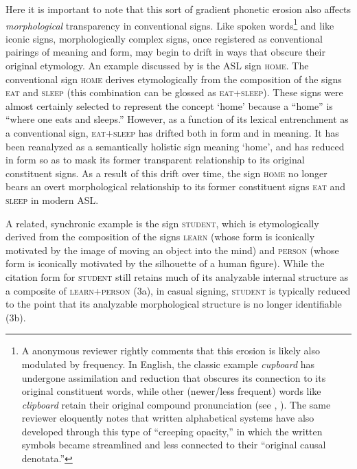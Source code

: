\documentclass[output=paper,
modfonts
]{LSP/langsci}
\begin{document}
  Here it is important to note that this sort of gradient phonetic erosion also affects \textit{morphological} transparency in conventional signs. Like spoken words\footnote{A anonymous reviewer rightly comments that this erosion is likely also modulated by frequency. In English, the classic example \textit{cupboard} has undergone assimilation and reduction that obscures its connection to its original constituent words, while other (newer/less frequent) words like \textit{clipboard} retain their original compound pronunciation (see \citealt{Zipf1935}, \citealt{Bybee2001}). The same reviewer eloquently notes that written alphabetical systems have also developed through this type of ``creeping opacity,'' in which the written symbols became streamlined and less connected to their ``original causal denotata.''} and like iconic signs, morphologically complex signs, once registered as conventional pairings of meaning and form, may begin to drift in ways that obscure their original etymology. An example discussed by \citet[707]{Frishberg1975} is the ASL sign \textsc{home}. The conventional sign \textsc{home} derives etymologically from the composition of the signs \textsc{eat} and \textsc{sleep} (this combination can be glossed as \textsc{eat+sleep)}. These signs were almost certainly selected to represent the concept `home' because a ``home'' is ``where one eats and sleeps.'' However, as a function of its lexical entrenchment as a conventional sign, \textsc{eat+sleep} has drifted both in form and in meaning. It has been reanalyzed as a semantically holistic sign meaning `home', and has reduced in form so as to mask its former transparent relationship to its original constituent signs. As a result of this drift over time, the sign \textsc{home} no longer bears an overt morphological relationship to its former constituent signs \textsc{eat} and \textsc{sleep} in modern ASL.

  A related, synchronic example is the sign \textsc{student}, which is etymologically derived from the composition of the signs \textsc{learn} (whose form is iconically motivated by the image of moving an object into the mind) and \textsc{person} (whose form is iconically motivated by the silhouette of a human figure). While the citation form for \textsc{student} still retains much of its analyzable internal structure as a composite of \textsc{learn+person} (3a), in casual signing, \textsc{student} is typically reduced to the point that its analyzable morphological structure is no longer identifiable (3b).
\end{document}
